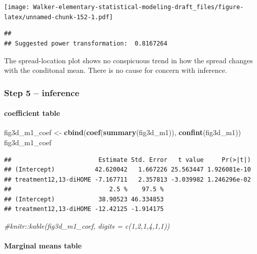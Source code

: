 \documentclass[]{book}
\newenvironment{Shaded}{\begin{snugshade}}{\end{snugshade}}
\newcommand{\CommentTok}[1]{\textcolor[rgb]{0.56,0.35,0.01}{\textit{#1}}}
\newcommand{\KeywordTok}[1]{\textcolor[rgb]{0.13,0.29,0.53}{\textbf{#1}}}
\newcommand{\NormalTok}[1]{#1}
\newcommand{\StringTok}[1]{\textcolor[rgb]{0.31,0.60,0.02}{#1}}
\let\oldparagraph\paragraph
\renewcommand{\paragraph}[1]{\oldparagraph{#1}\mbox{}}
\begin{document}
\texttt{[image: Walker-elementary-statistical-modeling-draft\_files/figure-latex/unnamed-chunk-152-1.pdf]}

\begin{verbatim}
## 
## Suggested power transformation:  0.8167264
\end{verbatim}

The spread-location plot shows no conspicuous trend in how the spread changes with the conditonal mean. There is no cause for concern with inference.

\hypertarget{step-5-inference}{%
\subsubsection{Step 5 -- inference}\label{step-5-inference}}

\hypertarget{coefficient-table}{%
\paragraph{coefficient table}\label{coefficient-table}}

\begin{Shaded}
\begin{Highlighting}[]
\NormalTok{fig3d_m1_coef <-}\StringTok{ }\KeywordTok{cbind}\NormalTok{(}\KeywordTok{coef}\NormalTok{(}\KeywordTok{summary}\NormalTok{(fig3d_m1)),}
                        \KeywordTok{confint}\NormalTok{(fig3d_m1))}
\NormalTok{fig3d_m1_coef}
\end{Highlighting}
\end{Shaded}

\begin{verbatim}
##                        Estimate Std. Error   t value     Pr(>|t|)
## (Intercept)           42.620042   1.667226 25.563447 1.926081e-10
## treatment12,13-diHOME -7.167711   2.357813 -3.039982 1.246296e-02
##                           2.5 %    97.5 %
## (Intercept)            38.90523 46.334853
## treatment12,13-diHOME -12.42125 -1.914175
\end{verbatim}

\begin{Shaded}
\begin{Highlighting}[]
\CommentTok{#knitr::kable(fig3d_m1_coef, digits = c(1,2,1,4,1,1))}
\end{Highlighting}
\end{Shaded}

\hypertarget{marginal-means-table}{%
\paragraph{Marginal means table}\label{marginal-means-table}}
\end{document}
